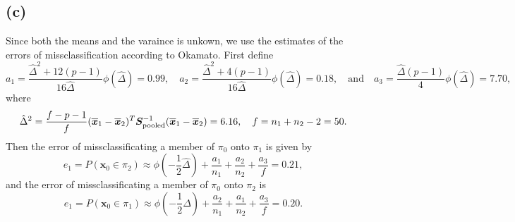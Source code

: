 \message{ !name(examination.tex)}\documentclass[one column]{report}
\renewcommand{\b}[1]{\bm{#1}}
\newcommand{\mean}[1]{\overline{\b{#1}}}
\begin{document}
\subsection*{(c)}
\label{sec:c-3}
Since both the means and the varaince is unkown, we use the estimates
of the errors of missclassification according to Okamato. First define 
\begin{equation*}
  a_{1} = \frac{\hat\Delta^{2} +
    12(p-1)}{16\hat\Delta}\phi(\hat\Delta) =0.99 ,  \quad a_{2} =
  \frac{\hat\Delta^{2} + 4(p-1)}{16\hat\Delta}\phi(\hat\Delta) =0.18 , \quad
  \text{and}\quad a_{3} = \frac{\hat\Delta(p-1)}{4}\phi(\hat\Delta) = 7.70,
\end{equation*}
where 
\begin{equation*}
  \hat\Delta^{2} = \frac{f - p - 1}{f} (\mean x_{1} - \mean x_{2})^{T}
  \b S_{\rm pooled}^{-1} (\mean x_{1} - \mean x_{2}) = 6.16,
  \quad f = n_{1} + n_{2} - 2 = 50.
\end{equation*}
Then the error of missclassificating a member of $\pi_{0}$ onto 
$\pi_{1}$ is given by 
\begin{equation*}
  e_{1} = P(\b x_{0} \in \pi_{2}) \approx  \phi(-\frac 12 \hat\Delta) + \frac{a_{1}}{n_{1}} +
  \frac{a_{2}}{n_{2}} + \frac{a_{3}}{f} = 0.21,  
\end{equation*}
and the error of missclassificating a member of $\pi_{0}$ onto 
$\pi_{2}$ is
\begin{equation*}
  e_{1} = P(\b x_{0} \in \pi_{1}) \approx  \phi(-\frac 12 \hat\Delta) + \frac{a_{2}}{n_{1}} +
  \frac{a_{1}}{n_{2}} + \frac{a_{3}}{f} = 0.20.
\end{equation*}



\begin{comment}
  
  We could calculate the linear separators, $ l_i^T x_0 + c_i$, where
  we obtain
  \begin{align*}
    l_1^T x_0 + c_1 &= (-0.57, 1.80, 1.01, 6.33, 18.94, 0.33)x_0 + -703.95 \\ 
    l_2^T x_0 + c_2 &= (-0.14, 1.31, 1.48, 5.15, 18.31, 0.04)x_0 + -554.06 \\ 
    l_3^T x_0 + c_3 &= (-1.08, 1.89, 3.03, 5.69, 15.11, 0.51)x_0 + -618.43,
  \end{align*}
  In which we can conclude that ${\bf x_0}$ belongs to  $\pi_i$ if $
  l_i^T x_0 + c_i = \max_i \left(   l_i^T x_0 + c_i\right)
  $

\end{comment}
\end{document}
